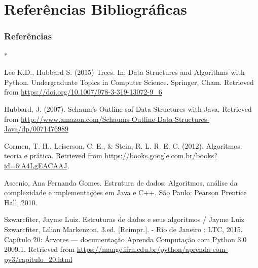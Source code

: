 \documentclass{beamer}
\begin{document}
\section{Referências Bibliográficas}
\begin{frame}[t,allowframebreaks]
\frametitle{Referências}
%
%
\begin{thebibliography}{*}

         Lee K.D., Hubbard S. (2015) Trees. In: Data Structures and Algorithms with Python. Undergraduate Topics in Computer Science. Springer, Cham. Retrieved from \url{https://doi.org/10.1007/978-3-319-13072-9_6}
        
        Hubbard, J. (2007). Schaum’s Outline sof Data Structures with Java. Retrieved from \url{http://www.amazon.com/Schaums-Outline-Data-Structures-Java/dp/0071476989}
        
         Cormen, T. H., Leiserson, C. E., \& Stein, R. L. R. E. C. (2012). Algoritmos: teoria e prática. Retrieved from \url{https://books.google.com.br/books?id=6iA4LgEACAAJ}.
        
         Ascenio, Ana Fernanda Gomes. Estrutura de dados: Algoritmos, análise da complexidade e implementações em Java e C++. São Paulo: Pearson Prentice Hall, 2010.
        
         Szwarcfiter, Jayme Luiz. Estruturas de dados e seus algoritmos / Jayme Luiz Szwarcfiter, Lilian Markenzon. 3.ed. [Reimpr.]. - Rio de Janeiro : LTC, 2015.
         Capítulo 20: Árvores — documentação Aprenda Computação com Python 3.0 2009.1. Retrieved from  \url{https://mange.ifrn.edu.br/python/aprenda-com-py3/capitulo_20.html}
\end{thebibliography}
\end{frame}
\section{}

\begin{frame}
\titlepage
\end{frame}
\end{document}
